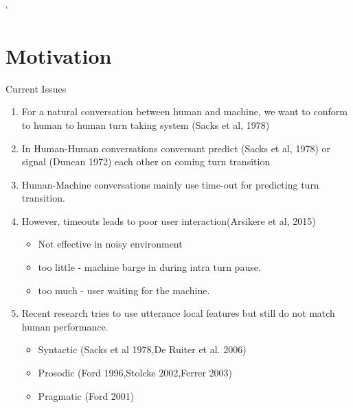 `%

\section{Motivation}
\frame{\sectionpage}




\begin{frame}{Current Issues}
    \begin{enumerate}[<+->]\itemsep9pt
      \item For a natural conversation between human and machine, we want to conform
            to human to human turn taking system (Sacks et al, 1978)
      \item In Human-Human conversations conversant predict (Sacks et al, 1978) or
            signal (Duncan 1972) each other on coming turn transition
      \item Human-Machine conversations mainly use time-out for predicting turn transition.      
      \item {
        However, timeouts leads to poor user interaction(Arsikere et al, 2015)
        \begin{itemize}
            \item Not effective in noisy environment
            \item too little - machine barge in during intra turn pause.
            \item too much - user waiting for the machine.
        \end{itemize}
      }
      \item {
        Recent research tries to use utterance local features but still do not match human performance.
        \begin{itemize}
            \item Syntactic (Sacks et al 1978,De Ruiter et al. 2006)
            \item Prosodic (Ford 1996,Stolcke 2002,Ferrer 2003)
            \item Pragmatic (Ford 2001)
        \end{itemize}
      }
    \end{enumerate}
\end{frame}

